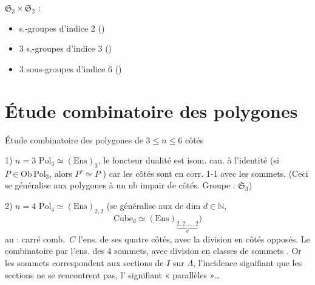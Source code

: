 \documentclass[11pt,a4paper]{article}
\begin{document}
$\mathfrak{S}_3 \times \mathfrak{S}_2$ :
\begin{itemize}
  \item {}  s.-groupes d'indice 2 ()
  \item 3 s.-groupes d'indice 3 ()
  \item 3 sous-groupes d'indice 6  ()
\end{itemize}

\section{Étude combinatoire des polygones}

Étude combinatoire des polygones de $3 \leq n \leq 6$ côtés

1) $n=3$ \quad $\mathrm{Pol}_3 \simeq (\mathrm{Ens})_3$, le foncteur dualité est isom. can. à l'identité (si $P \in \mathrm{Ob}\,\mathrm{Pol}_3$, alors $P^\circ \simeq P$ ) car les côtés sont en corr. 1-1 avec les sommets. (Ceci se généralise aux polygones à un nb impair de côtés. Groupe : $\mathfrak{S}_3$)

2) $n = 4$ \quad $\mathrm{Pol}_4 \simeq (\mathrm{Ens})_{2,2}$ (se généralise aux  de dim $d \in \mathbb{N}$,
\[
  \mathrm{Cube}_d \simeq (\mathrm{Ens})_{\underbrace{2,2,\dots,2}_{d}} \Big)
\]
\struck{\ill{}}  au  :  carré comb.\ $C$ l'ens. de ses quatre côtés, avec la division en côtés opposés. Le  combinatoire  par l'ens. des 4 sommets, avec division en classes de sommets . Or les sommets correspondent aux sections de $I$ sur $\Lambda$, l'incidence signifiant que les  sections ne se rencontrent pas, l'   signifiant « parallèles »…


\end{document}
